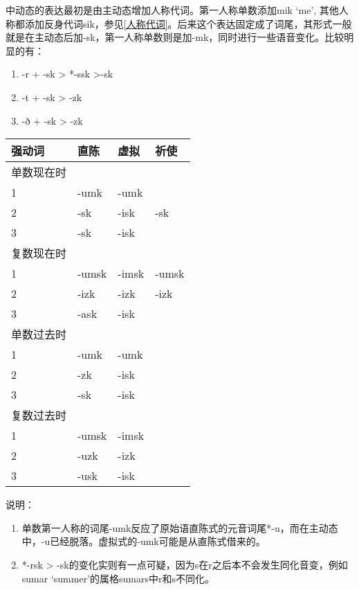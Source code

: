 中动态的表达最初是由主动态增加人称代词。第一人称单数添加mik `me',
其他人称都添加反身代词sik，参见\ref{人称代词}。后来这个表达固定成了词尾，其形式一般就是在主动态后加-sk，第一人称单数则是加-mk，同时进行一些语音变化。比较明显的有：

\begin{enumerate}
  \def\labelenumi{\arabic{enumi})}
  \item
        -r + -sk \textgreater{} *-ssk \textgreater-sk
  \item
        -t + -sk \textgreater{} -zk
  \item
        -ð + -sk \textgreater{} -zk
\end{enumerate}

\begin{longtable}{llll}
  \toprule
  强动词   & 直陈    & 虚拟    & 祈使    \\
  \midrule
  \endhead
  \bottomrule
  \endfoot
  单数现在时 &       &       &       \\
  1     & -umk  & -umk  &       \\
  2     & -sk   & -isk  & -sk   \\
  3     & -sk   & -isk  &       \\
  复数现在时 &       &       &       \\
  1     & -umsk & -imsk & -umsk \\
  2     & -izk  & -izk  & -izk  \\
  3     & -ask  & -isk  &       \\
  单数过去时 &       &       &       \\
  1     & -umk  & -umk  &       \\
  2     & -zk   & -isk  &       \\
  3     & -sk   & -isk  &       \\
  复数过去时 &       &       &       \\
  1     & -umsk & -imsk &       \\
  2     & -uzk  & -izk  &       \\
  3     & -usk  & -isk  &       \\
\end{longtable}

说明：

\begin{enumerate}
  \def\labelenumi{\arabic{enumi})}
  \item
        单数第一人称的词尾-umk反应了原始语直陈式的元音词尾*-u，而在主动态中，-u已经脱落。虚拟式的-umk可能是从直陈式借来的。
  \item
        *-rsk \textgreater{}
        -sk的变化实则有一点可疑，因为s在r之后本不会发生同化音变，例如sumar
        `summer'的属格sumars中r和s不同化。
\end{enumerate}


